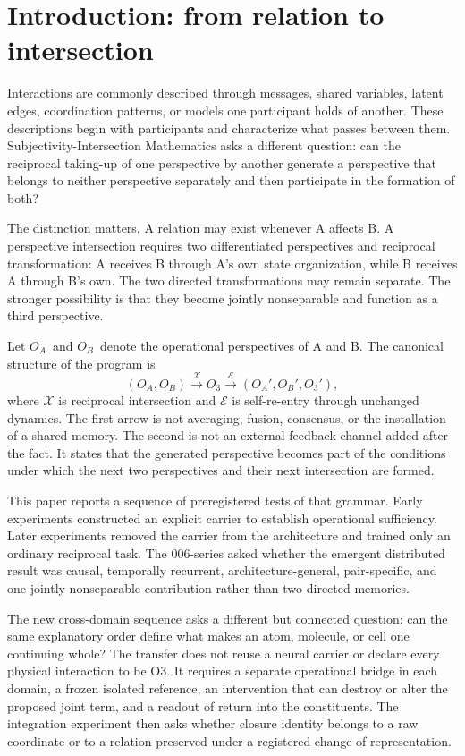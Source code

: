 \documentclass[11pt,a4paper]{article}
\newcommand{\OA}{\ensuremath{O_{A}}}
\newcommand{\OB}{\ensuremath{O_{B}}}
\newcommand{\Othree}{\ensuremath{O_{3}}}
\begin{document}
\section{Introduction: from relation to intersection}

Interactions are commonly described through messages, shared variables, latent edges, coordination patterns, or models one participant holds of another. These descriptions begin with participants and characterize what passes between them. Subjectivity-Intersection Mathematics asks a different question: can the reciprocal taking-up of one perspective by another generate a perspective that belongs to neither perspective separately and then participate in the formation of both?

The distinction matters. A relation may exist whenever A affects B. A perspective intersection requires two differentiated perspectives and reciprocal transformation: A receives B through A's own state organization, while B receives A through B's own. The two directed transformations may remain separate. The stronger possibility is that they become jointly nonseparable and function as a third perspective.

Let \OA\ and \OB\ denote the operational perspectives of A and B. The canonical structure of the program is
\begin{equation}
 (\OA,\OB)
 \xrightarrow{\mathcal X}
 \Othree
 \xrightarrow{\mathcal E}
 (\OA',\OB',\Othree'),
 \label{eq:canonical}
\end{equation}
where $\mathcal X$ is reciprocal intersection and $\mathcal E$ is self-re-entry through unchanged dynamics. The first arrow is not averaging, fusion, consensus, or the installation of a shared memory. The second is not an external feedback channel added after the fact. It states that the generated perspective becomes part of the conditions under which the next two perspectives and their next intersection are formed.

This paper reports a sequence of preregistered tests of that grammar. Early experiments constructed an explicit carrier to establish operational sufficiency. Later experiments removed the carrier from the architecture and trained only an ordinary reciprocal task. The 006-series asked whether the emergent distributed result was causal, temporally recurrent, architecture-general, pair-specific, and one jointly nonseparable contribution rather than two directed memories.

The new cross-domain sequence asks a different but connected question: can the same explanatory order define what makes an atom, molecule, or cell one continuing whole? The transfer does not reuse a neural carrier or declare every physical interaction to be O3. It requires a separate operational bridge in each domain, a frozen isolated reference, an intervention that can destroy or alter the proposed joint term, and a readout of return into the constituents. The integration experiment then asks whether closure identity belongs to a raw coordinate or to a relation preserved under a registered change of representation.
\end{document}
